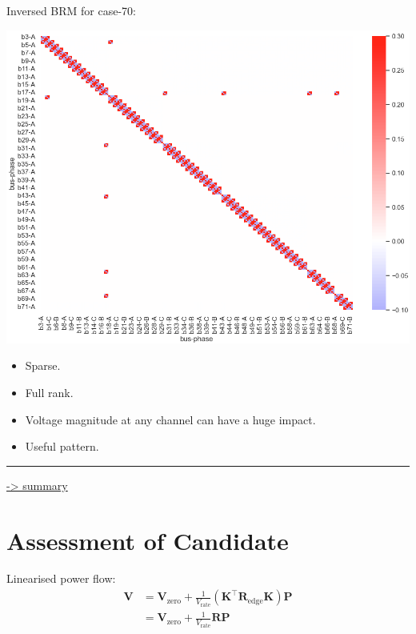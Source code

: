 \documentclass[
]{book}
\providecommand{\tightlist}{%
  \setlength{\itemsep}{0pt}\setlength{\parskip}{0pt}}
\begin{document}
Inversed BRM for case-70:

\begin{center}\includegraphics{Pictures/figHeatmapBrmInv} \end{center}

\begin{itemize}
\tightlist
\item
  Sparse.
\item
  Full rank.
\item
  Voltage magnitude at any channel can have a huge impact.
\item
  Useful pattern.
\end{itemize}

\begin{center}\rule{0.5\linewidth}{0.5pt}\end{center}

\protect\hyperlink{summary}{-\textgreater{} summary}

\hypertarget{assessment}{%
\section{Assessment of Candidate}\label{assessment}}

Linearised power flow:
\[ \begin{aligned}
  \boldsymbol{V} &= \boldsymbol{V}_\text{zero} + \frac{1}{V_\text{rate}}
    \left(
      \boldsymbol{K}^{\top} \boldsymbol{R}_\text{edge} \boldsymbol{K}
    \right) \boldsymbol{P} \\
  {} &= \boldsymbol{V}_\text{zero}
      + \frac{1}{V_\text{rate}} \boldsymbol{R} \boldsymbol{P}
\end{aligned} \]
\end{document}
